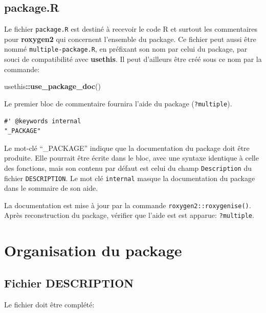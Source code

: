 \documentclass[
  12pt,
  french,
  a4paper,
  extrafontsizes,onecolumn,openright
  ]{memoir}
\newenvironment{Shaded}{\begin{snugshade}}{\end{snugshade}}
\newcommand{\FunctionTok}[1]{\textcolor[rgb]{0.13,0.29,0.53}{\textbf{#1}}}
\newcommand{\NormalTok}[1]{#1}
\newcommand{\SpecialCharTok}[1]{\textcolor[rgb]{0.81,0.36,0.00}{\textbf{#1}}}
\begin{document}
\subsection{package.R}\label{package.r}

Le fichier \texttt{package.R} est destiné à recevoir le code R et surtout les commentaires pour \textbf{roxygen2} qui concernent l'ensemble du package.
Ce fichier peut aussi être nommé \texttt{multiple-package.R}, en préfixant son nom par celui du package, par souci de compatibilité avec \textbf{usethis}.
Il peut d'ailleurs être créé sous ce nom par la commande:

\scriptsize

\begin{Shaded}
\begin{Highlighting}[]
\NormalTok{usethis}\SpecialCharTok{::}\FunctionTok{use\_package\_doc}\NormalTok{()}
\end{Highlighting}
\end{Shaded}

\normalsize

Le premier bloc de commentaire fournira l'aide du package (\texttt{?multiple}).

\begin{verbatim}
#' @keywords internal 
"_PACKAGE"
\end{verbatim}

Le mot-clé ``\_PACKAGE'' indique que la documentation du package doit être produite.
Elle pourrait être écrite dans le bloc, avec une syntaxe identique à celle des fonctions, mais son contenu par défaut est celui du champ \texttt{Description} du fichier \texttt{DESCRIPTION}.
Le mot clé \texttt{internal} masque la documentation du package dans le sommaire de son aide.

La documentation est mise à jour par la commande \texttt{roxygen2::roxygenise()}.
Après reconstruction du package, vérifier que l'aide est est apparue: \texttt{?multiple}.

\section{Organisation du package}\label{organisation-du-package}

\subsection{Fichier DESCRIPTION}\label{sec:package-description}

Le fichier doit être complété:
\end{document}
